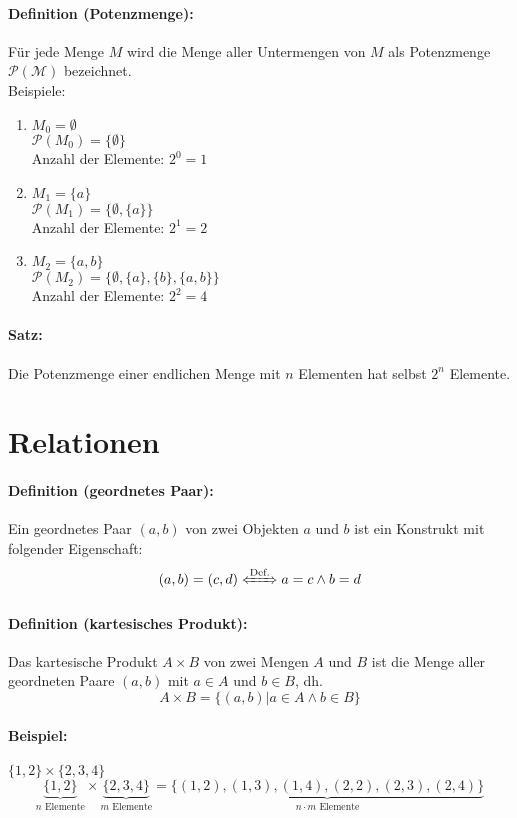 \documentclass[10pt,a4paper]{article}
\begin{document}
\paragraph{Definition (Potenzmenge):}Für jede Menge $M$ wird die Menge aller Untermengen von $M$ als Potenzmenge $\mathcal{P(M)}$ bezeichnet.\\

Beispiele:
\begin{enumerate}
\item $M_0=\emptyset$ \\
$\mathcal{P}(M_0)=\{\emptyset\}$ \\
Anzahl der Elemente: $2^0=1$
\item $M_1=\{a\}$\\
$\mathcal{P}(M_1)=\{\emptyset,\{a\}\}$ \\
Anzahl der Elemente: $2^1=2$
\item $M_2=\{a,b\}$ \\
$\mathcal{P}(M_2)=\{\emptyset,\{a\},\{b\},\{a,b\}\}$ \\
Anzahl der Elemente: $2^2=4$
\end{enumerate}

\paragraph{Satz:}Die Potenzmenge einer endlichen Menge mit $n$ Elementen hat selbst $2^n$ Elemente.

\section{Relationen}
\paragraph{Definition (geordnetes Paar):}Ein geordnetes Paar $(a,b)$ von zwei Objekten $a$ und $b$ ist ein Konstrukt mit folgender Eigenschaft:
\[
(a,b) = (c,d) \xLeftrightarrow{\text{Def.}} a=c \land b=d
\]
\paragraph{Definition (kartesisches Produkt):}Das kartesische Produkt $A\times B$ von zwei Mengen $A$ und $B$ ist die Menge aller geordneten Paare $(a,b)$ mit $a\in A$ und $b\in B$, dh.
\[
A\times B = \{(a,b) | a\in A \land b\in B\}
\]

\paragraph{Beispiel:}$\{1,2\}\times \{2,3,4\}$
\[
\underbrace{ \{1,2\} }_{n\text{ Elemente}} \times \underbrace{ \{2,3,4\} }_{m\text{ Elemente}} = \underbrace{ \{ (1,2), (1,3), (1,4), (2,2), (2,3), (2,4) \} }_{n\cdot m\text{ Elemente}}
\]
\end{document}
